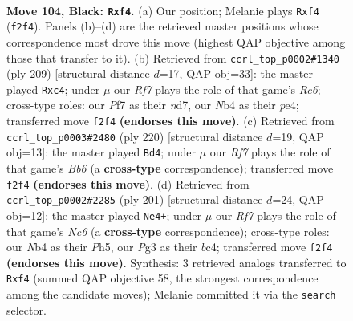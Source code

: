 \documentclass[11pt]{article}
\begin{document}
\clearpage

\begin{figure}[p]\centering
\begin{subfigure}{0.46\textwidth}\centering
\resizebox{\linewidth}{!}{%
\newchessgame
\chessboard[
  setfen={5k2/5p2/6p1/4P3/1n3P2/1B4p1/5r2/6K1 b - - 7 104},
  showmover=false,
  pgfstyle=straightmove, color=movearrow, markmove={f2-f4}
]}
\caption{}
\end{subfigure}\hfill
\begin{subfigure}{0.46\textwidth}\centering
\resizebox{\linewidth}{!}{%
\newchessgame
\chessboard[
  setfen={8/3N3k/8/2p5/PpP1P3/2r5/1K6/8 b - - 3 105},
  showmover=false,
  pgfstyle=straightmove, color=movearrow, markmove={c3-c4}
]}
\caption{}
\end{subfigure}
\\[4pt]
\begin{subfigure}{0.46\textwidth}\centering
\resizebox{\linewidth}{!}{%
\newchessgame
\chessboard[
  setfen={8/8/1Bk5/4Pp2/5Pp1/6P1/6K1/4b3 w - - 51 111},
  showmover=false,
  pgfstyle=straightmove, color=movearrow, markmove={b6-d4}
]}
\caption{}
\end{subfigure}\hfill
\begin{subfigure}{0.46\textwidth}\centering
\resizebox{\linewidth}{!}{%
\newchessgame
\chessboard[
  setfen={8/6k1/6p1/5p1p/2B2P1P/2n5/3K4/8 b - - 59 101},
  showmover=false,
  pgfstyle=straightmove, color=movearrow, markmove={c3-e4}
]}
\caption{}
\end{subfigure}
\caption{\textbf{Move 104, Black: \texttt{Rxf4}.} (a) Our position; Melanie plays \texttt{Rxf4} (\texttt{f2f4}). Panels (b)--(d) are the retrieved master positions whose correspondence most drove this move (highest QAP objective among those that transfer to it). (b) Retrieved from \texttt{ccrl\_top\_p0002\#1340} (ply 209) [structural distance $d$=17, QAP obj=33]: the master played \texttt{Rxc4}; under $\mu$ our \emph{Rf7} plays the role of that game's \emph{Rc6}; cross-type roles: our \emph{P}f7 as their \emph{n}d7, our \emph{N}b4 as their \emph{p}e4; transferred move \texttt{f2f4} \textbf{(endorses this move)}. (c) Retrieved from \texttt{ccrl\_top\_p0003\#2480} (ply 220) [structural distance $d$=19, QAP obj=13]: the master played \texttt{Bd4}; under $\mu$ our \emph{Rf7} plays the role of that game's \emph{Bb6} (a \textbf{cross-type} correspondence); transferred move \texttt{f2f4} \textbf{(endorses this move)}. (d) Retrieved from \texttt{ccrl\_top\_p0002\#2285} (ply 201) [structural distance $d$=24, QAP obj=12]: the master played \texttt{Ne4+}; under $\mu$ our \emph{Rf7} plays the role of that game's \emph{Nc6} (a \textbf{cross-type} correspondence); cross-type roles: our \emph{N}b4 as their \emph{P}h5, our \emph{P}g3 as their \emph{b}c4; transferred move \texttt{f2f4} \textbf{(endorses this move)}. Synthesis: 3 retrieved analogs transferred to \texttt{Rxf4} (summed QAP objective 58, the strongest correspondence among the candidate moves); Melanie committed it via the \texttt{search} selector.}
\label{fig:thought-m207}
\end{figure}
\end{document}

